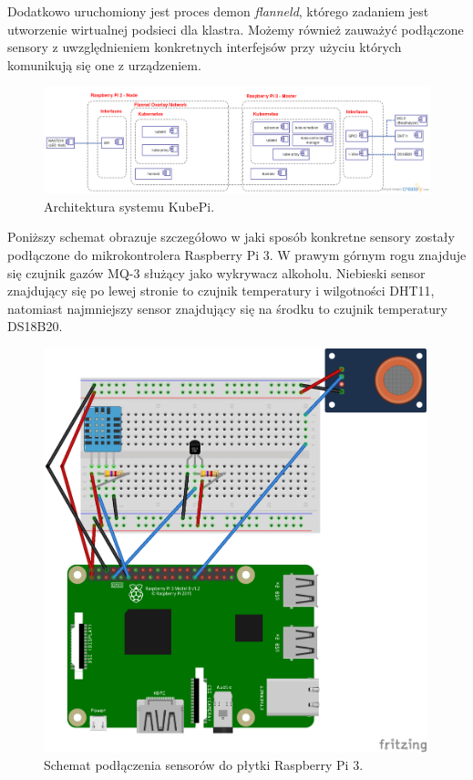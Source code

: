 \documentclass[12pt]{report}
\begin{document}
{Dodatkowo uruchomiony jest proces demon \textit{flanneld}, którego zadaniem jest utworzenie wirtualnej podsieci dla klastra. Możemy również zauważyć podłączone sensory z uwzględnieniem konkretnych interfejsów przy użyciu których komunikują się one z urządzeniem.


\begin{figure}[h]
	\centering
	\includegraphics[height=0.41\textwidth, angle=90]{images/KubePi-Architecture.png}
	\caption{Architektura systemu KubePi.}
\end{figure}
\FloatBarrier	

Poniższy schemat obrazuje szczegółowo w jaki sposób konkretne sensory zostały podłączone do mikrokontrolera Raspberry Pi 3. W prawym górnym rogu znajduje się czujnik gazów MQ-3 służący jako wykrywacz alkoholu. Niebieski sensor znajdujący się po lewej stronie to czujnik temperatury i wilgotności DHT11, natomiast najmniejszy sensor znajdujący się na środku to czujnik temperatury DS18B20.

\begin{figure}[h]
	\centering
	\includegraphics[width=0.99\textwidth]{images/rpi-master.png}
	\caption{Schemat podłączenia sensorów do płytki Raspberry Pi 3.}
\end{figure}
\FloatBarrier	

}
\end{document}
